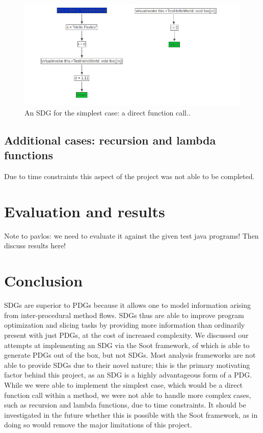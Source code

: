 \documentclass[authoryear,preprint]{sigplanconf}
\begin{document}
\begin{figure}[ht]
	\centering
	\includegraphics[width=.6\linewidth]{figures/Selection_083}
	\caption[An SDG for the simplest case: a direct function call.]{\label{f:firstImpl}An SDG for the simplest case: a direct function call..}
\end{figure}

\subsection{Additional cases: recursion and lambda functions}

Due to time constraints this aspect of the project was not able to be completed.

\section{Evaluation and results}

Note to pavlos: we need to evaluate it against the given test java programs! Then discuss results here!

\section{Conclusion}

SDGs are superior to PDGs because it allows one to model information arising from inter-procedural method flows. SDGs thus are able to improve program optimization and slicing tasks by providing more information than ordinarily present with just PDGs, at the cost of increased complexity. We discussed our attempts at implementing an SDG via the Soot framework, of which is able to generate PDGs out of the box, but not SDGs. Most analysis frameworks are not able to provide SDGs due to their novel nature; this is the primary motivating factor behind this project, as an SDG is a highly advantageous form of a PDG. While we were able to implement the simplest case, which would be a direct function call within a method, we were not able to handle more complex cases, such as recursion and lambda functions, due to time constraints. It should be investigated in the future whether this is possible with the Soot framework, as in doing so would remove the major limitations of this project.






\end{document}
